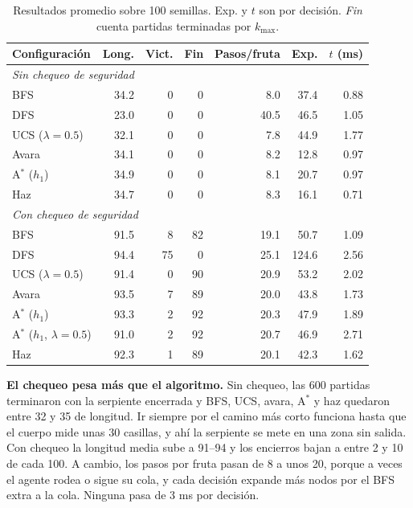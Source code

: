 \documentclass[11pt,letterpaper]{article}
\begin{document}
\begin{table}[h]
\centering\footnotesize\renewcommand{\arraystretch}{0.88}\setlength{\tabcolsep}{4pt}
\caption{Resultados promedio sobre 100 semillas. Exp. y $t$ son por decisión. \emph{Fin} cuenta partidas terminadas por $k_{\max}$.}
\label{tab:res}
\begin{tabular}{lrrrrrr}
\toprule
Configuración & Long. & Vict. & Fin & Pasos/fruta & Exp. & $t$ (ms)\\
\midrule
\multicolumn{7}{l}{\textit{Sin chequeo de seguridad}}\\
BFS & 34.2 & 0 & 0 & 8.0 & 37.4 & 0.88\\
DFS & 23.0 & 0 & 0 & 40.5 & 46.5 & 1.05\\
UCS ($\lambda{=}0.5$) & 32.1 & 0 & 0 & 7.8 & 44.9 & 1.77\\
Avara & 34.1 & 0 & 0 & 8.2 & 12.8 & 0.97\\
A$^*$ ($h_1$) & 34.9 & 0 & 0 & 8.1 & 20.7 & 0.97\\
Haz & 34.7 & 0 & 0 & 8.3 & 16.1 & 0.71\\
\midrule
\multicolumn{7}{l}{\textit{Con chequeo de seguridad}}\\
BFS & 91.5 & 8 & 82 & 19.1 & 50.7 & 1.09\\
DFS & 94.4 & 75 & 0 & 25.1 & 124.6 & 2.56\\
UCS ($\lambda{=}0.5$) & 91.4 & 0 & 90 & 20.9 & 53.2 & 2.02\\
Avara & 93.5 & 7 & 89 & 20.0 & 43.8 & 1.73\\
A$^*$ ($h_1$) & 93.3 & 2 & 92 & 20.3 & 47.9 & 1.89\\
A$^*$ ($h_1$, $\lambda{=}0.5$) & 91.0 & 2 & 92 & 20.7 & 46.9 & 2.71\\
Haz & 92.3 & 1 & 89 & 20.1 & 42.3 & 1.62\\
\bottomrule
\end{tabular}
\end{table}

\textbf{El chequeo pesa más que el algoritmo.} Sin chequeo, las 600 partidas terminaron con la serpiente encerrada y BFS, UCS, avara, A$^*$ y haz quedaron entre 32 y 35 de longitud. Ir siempre por el camino más corto funciona hasta que el cuerpo mide unas 30 casillas, y ahí la serpiente se mete en una zona sin salida. Con chequeo la longitud media sube a 91--94 y los encierros bajan a entre 2 y 10 de cada 100. A cambio, los pasos por fruta pasan de 8 a unos 20, porque a veces el agente rodea o sigue su cola, y cada decisión expande más nodos por el BFS extra a la cola. Ninguna pasa de 3 ms por decisión.
\end{document}
